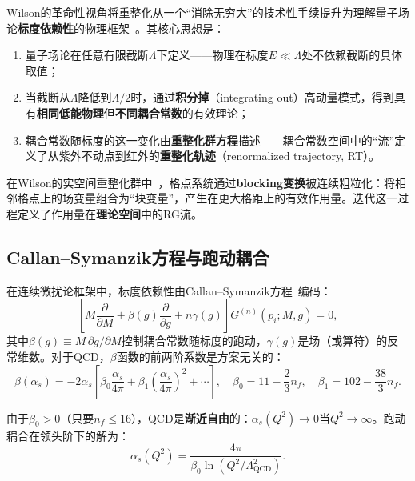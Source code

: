 \documentclass[12pt,a4paper]{ctexart}
\theoremstyle{definition}
\begin{document}
Wilson的革命性视角将重整化从一个``消除无穷大''的技术性手续提升为理解量子场论\textbf{标度依赖性}的物理框架~\cite{PeskinSchroeder1995}。其核心思想是：

\begin{enumerate}[leftmargin=*]
    \item 量子场论在任意有限截断$\Lambda$下定义——物理在标度$E \ll \Lambda$处不依赖截断的具体取值；
    \item 当截断从$\Lambda$降低到$\Lambda/2$时，通过\textbf{积分掉}（integrating out）高动量模式，得到具有\textbf{相同低能物理}但\textbf{不同耦合常数}的有效理论；
    \item 耦合常数随标度的这一变化由\textbf{重整化群方程}描述——耦合常数空间中的``流''定义了从紫外不动点到红外的\textbf{重整化轨迹}（renormalized trajectory, RT）。
\end{enumerate}

在Wilson的实空间重整化群中~\cite{GattringerLang2010}，格点系统通过{\bf blocking变换}被连续粗粒化：将相邻格点上的场变量组合为``块变量''，产生在更大格距上的有效作用量。迭代这一过程定义了作用量在\textbf{理论空间}中的RG流。

\subsection{Callan--Symanzik方程与跑动耦合}

在连续微扰论框架中，标度依赖性由Callan--Symanzik方程~\cite{PeskinSchroeder1995}编码：
\begin{equation}
\left[ M\frac{\partial}{\partial M} + \beta(g)\frac{\partial}{\partial g} + n\gamma(g) \right] G^{(n)}(p_i; M, g) = 0,
\label{eq:Callan_Symanzik}
\end{equation}
其中$\beta(g) \equiv M\,\partial g/\partial M$控制耦合常数随标度的跑动，$\gamma(g)$是场（或算符）的反常维数。对于QCD，$\beta$函数的前两阶系数是方案无关的：
\begin{equation}
\beta(\alpha_s) = -2\alpha_s\left[ \beta_0\frac{\alpha_s}{4\pi} + \beta_1\left(\frac{\alpha_s}{4\pi}\right)^2 + \cdots \right], \quad
\beta_0 = 11 - \frac{2}{3}n_f, \quad \beta_1 = 102 - \frac{38}{3}n_f.
\label{eq:beta_QCD}
\end{equation}

由于$\beta_0 > 0$（只要$n_f \le 16$），QCD是\textbf{渐近自由}的：$\alpha_s(Q^2) \to 0$当$Q^2 \to \infty$。跑动耦合在领头阶下的解为：
\begin{equation}
\alpha_s(Q^2) = \frac{4\pi}{\beta_0 \ln(Q^2/\Lambda_{\text{QCD}}^2)}.
\label{eq:running_alpha_LO}
\end{equation}
\end{document}
